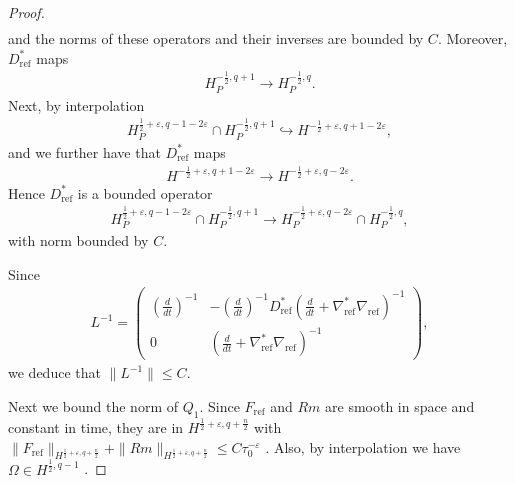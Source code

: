 \documentclass[12pt]{amsart}
\renewcommand{\1}{{\mathbf 1}}
\theoremstyle{others}
\numberwithin{equation}{section}
\begin{document}
\begin{proof}
\begin{align*}
\end{align*} and the norms of these operators and their inverses are bounded by \(C\). Moreover, \(D_{\text{ref}}^\ast\) maps
\begin{align*}
     H_P^{-\frac{1}{2}, q +1} \to H_P^{-\frac{1}{2}, q}.
\end{align*} Next, by interpolation
\begin{align*}
    H_P^{\frac{1}{2} + \varepsilon, q-1-2\varepsilon} \cap H_P^{-\frac{1}{2}, q +1} \hookrightarrow H^{-\frac{1}{2} + \varepsilon, q + 1 -2\varepsilon},
\end{align*} and we further have that \(D_{\text{ref}}^\ast\) maps
\begin{align*}
    H^{-\frac{1}{2} + \varepsilon, q + 1 -2\varepsilon} \to H^{-\frac{1}{2} + \varepsilon, q -2\varepsilon}.
\end{align*} Hence \(D_{\text{ref}}^\ast\) is a bounded operator
\begin{align*}
     H_P^{\frac{1}{2} + \varepsilon, q-1-2\varepsilon} \cap H_P^{-\frac{1}{2}, q +1} \to H_P^{-\frac{1}{2} + \varepsilon, q - 2\varepsilon} \cap H_P^{-\frac{1}{2}, q},
\end{align*}with norm bounded by \(C\). 

Since 
\begin{align*}
    L^{-1} = 
    \begin{pmatrix}
        (\frac{d}{dt})^{-1} & -(\frac{d}{dt})^{-1}D_{\text{ref}}^\ast (\frac{d}{dt} + \nabla_{\text{ref}}^\ast \nabla_{\text{ref}})^{-1} \\
        0 & (\frac{d}{dt} + \nabla_{\text{ref}}^\ast \nabla_{\text{ref}})^{-1}
    \end{pmatrix},
\end{align*} we deduce that \(\|L^{-1}\| \leq C\). \par 
Next we bound the norm of \(Q_1\). Since \(F_{\text{ref}}\) and \(Rm\) are smooth in space and constant in time, they are in \(H^{\frac{1}{2} + \varepsilon, q+\frac{n}{2}}\) with \(\|F_{\text{ref}}\|_{H^{\frac{1}{2} + \varepsilon, q+ \frac{n}{2}}} + \|Rm\|_{H^{\frac{1}{2} + \varepsilon, q+\frac{n}{2}}} \leq  C \tau_0^{-\varepsilon}\) \cite[pg. 43]{radethesis}. Also, by interpolation we have \(\Omega \in H^{\frac{1}{2}, q-1}\) \cite[(73)]{radethesis}.

\end{proof}
\end{document}
